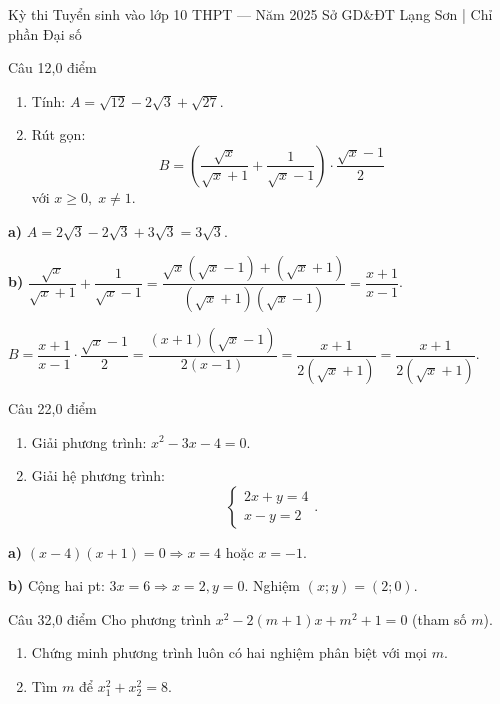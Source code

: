 ﻿%
%
  {Kỳ thi Tuyển sinh vào lớp 10 THPT — Năm 2025}%
  {Sở GD\&ĐT Lạng Sơn | Chỉ phần Đại số}

\begin{de_cau}{Câu 1}{2,0 điểm}
\begin{enumerate}[label=\alph*)]
  \item Tính: $A = \sqrt{12} - 2\sqrt{3} + \sqrt{27}$.
  \item Rút gọn:
  \[B = \left(\dfrac{\sqrt{x}}{\sqrt{x}+1} + \dfrac{1}{\sqrt{x}-1}\right) \cdot \dfrac{\sqrt{x}-1}{2}\]
  với $x \ge 0,\; x \neq 1$.
\end{enumerate}
\end{de_cau}

\begin{loi_giai_cau}
\textbf{a)} $A = 2\sqrt{3}-2\sqrt{3}+3\sqrt{3} = \boxed{3\sqrt{3}}$.

\textbf{b)} $\dfrac{\sqrt{x}}{\sqrt{x}+1}+\dfrac{1}{\sqrt{x}-1} = \dfrac{\sqrt{x}(\sqrt{x}-1)+(\sqrt{x}+1)}{(\sqrt{x}+1)(\sqrt{x}-1)} = \dfrac{x+1}{x-1}$.

$B = \dfrac{x+1}{x-1}\cdot\dfrac{\sqrt{x}-1}{2} = \dfrac{(x+1)(\sqrt{x}-1)}{2(x-1)} = \dfrac{x+1}{2(\sqrt{x}+1)} = \boxed{\dfrac{x+1}{2(\sqrt{x}+1)}}$.
\end{loi_giai_cau}

\begin{de_cau}{Câu 2}{2,0 điểm}
\begin{enumerate}[label=\alph*)]
  \item Giải phương trình: $x^2 - 3x - 4 = 0$.
  \item Giải hệ phương trình:
  \[\begin{cases} 2x + y = 4 \\ x - y = 2 \end{cases}.\]
\end{enumerate}
\end{de_cau}

\begin{loi_giai_cau}
\textbf{a)} $(x-4)(x+1)=0 \Rightarrow \boxed{x=4}$ hoặc $\boxed{x=-1}$.

\textbf{b)} Cộng hai pt: $3x = 6 \Rightarrow x=2, y=0$. Nghiệm $\boxed{(x;y)=(2;0)}$.
\end{loi_giai_cau}

\begin{de_cau}{Câu 3}{2,0 điểm}
Cho phương trình $x^2 - 2(m+1)x + m^2+1 = 0$ (tham số $m$).
\begin{enumerate}[label=\alph*)]
  \item Chứng minh phương trình luôn có hai nghiệm phân biệt với mọi $m$.
  \item Tìm $m$ để $x_1^2 + x_2^2 = 8$.
\end{enumerate}
\end{de_cau}

